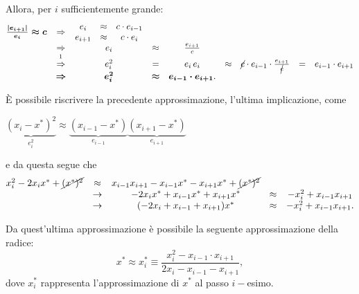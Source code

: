 Allora, per $i$ sufficientemente grande:
\begin{equation*}
	\begin{matrix}
		\boldsymbol{\frac{|e_{i+1}|}{e_i}\approx c}&\Rightarrow&
		\begin{matrix}
			e_i &\approx& c\cdot e_{i-1}\\
			e_{i+1}&\approx& c\cdot e_i
		\end{matrix}\\
		&\Rightarrow& e_i &\approx& \frac{e_{i+1}}{c}\\
		&\overset{\footnotemark}{\Rightarrow}& e_i^2&=&e_i\,e_i&\approx&\cancel{c}\cdot e_{i-1}\cdot \frac{e_{i+1}}{\cancel{c}}&=&e_{i-1}\cdot e_{i+1}\\
		&\boldsymbol\Rightarrow&\boldsymbol{e_i^2}&\boldsymbol\approx& \boldsymbol{e_{i-1}\cdot e_{i+1}}.
	\end{matrix}
\end{equation*}

È possibile riscrivere la precedente approssimazione, l'ultima implicazione, come
\begin{center}
	$\underbrace{(x_i-x^*)^2}_{\text{$e_i^2$}}\approx\underbrace{(x_{i-1}-x^*)}_{\text{$e_{i-1}$}}\underbrace{(x_{i+1}-x^*)}_{\text{$e_{i+1}$}}$ 
\end{center}
e da questa segue che
\begin{equation*}
	\begin{matrix}
		x_i^2-2x_i x^*+\cancel{(x^*)^2}&\approx& x_{i-1} x_{i+1}-x_{i-1} x^* - x_{i+1} x^*+\cancel{(x^*)^2}\\
		&\rightarrow&-2x_i x^*+x_{i-1} x^*+x_{i+1}x^*&\approx&-x_i^2+x_{i-1} x_{i+1}\\
		&\rightarrow&(-2x_i+x_{i-1}+x_{i+1})x^* &\approx& -x_i^2+x_{i-1} x_{i+1}.
	\end{matrix}
\end{equation*}

Da quest'ultima approssimazione è possibile la seguente approssimazione della radice:
\begin{equation}\label{eq:approxAitken}
	x^*\approx x_i^*\equiv\frac{x_i^2-x_{i-1}\cdot x_{i+1}}{2x_i-x_{i-1}-x_{i+1}},
\end{equation}
dove $x_i^*$ rappresenta l'approssimazione di $x^*$ al passo $i-$esimo.

